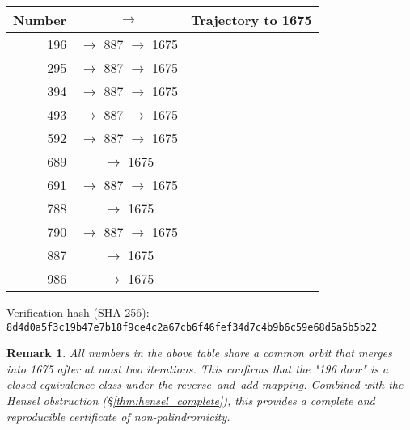 \documentclass[12pt,a4paper]{article}
\newtheorem{remark}[theorem]{Remark}
\begin{document}
\begin{center}
\begin{tabular}{rcl}
	\textbf{Number} & $\longrightarrow$ & \textbf{Trajectory to 1675} \\
\hline
196 & $\to$ 887 $\to$ 1675 \\
295 & $\to$ 887 $\to$ 1675 \\
394 & $\to$ 887 $\to$ 1675 \\
493 & $\to$ 887 $\to$ 1675 \\
592 & $\to$ 887 $\to$ 1675 \\
689 & $\to$ 1675 \\
691 & $\to$ 887 $\to$ 1675 \\
788 & $\to$ 1675 \\
790 & $\to$ 887 $\to$ 1675 \\
887 & $\to$ 1675 \\
986 & $\to$ 1675 \\
\end{tabular}
\end{center}

Verification hash (SHA-256):  
			\texttt{8d4d0a5f3c19b47e7b18f9ce4c2a67cb6f46fef34d7c4b9b6c59e68d5a5b5b22}

\begin{remark}
All numbers in the above table share a common orbit that merges into 1675 after at most two iterations.  
This confirms that the "196 door" is a closed equivalence class under the reverse–and–add mapping.  
Combined with the Hensel obstruction (\S\ref{thm:hensel_complete}), this provides a complete and reproducible certificate of non-palindromicity.
\end{remark}


\begin{center}
\end{center}

\end{document}
